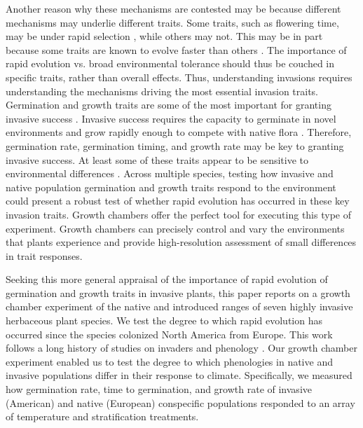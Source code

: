 \documentclass[12pt]{article}\usepackage[]{graphicx}\usepackage[]{color}
\begin{document}
	Another reason why these mechanisms are contested may be because different mechanisms may underlie different traits. Some traits, such as flowering time, may be under rapid selection \parencite{Weber1998}, while others may not. This may be in part because some traits are known to evolve faster than others \parencite{Weiss-Lehman2017}. The importance of rapid evolution vs. broad environmental tolerance should thus be couched in specific traits, rather than overall effects. Thus,  understanding invasions requires understanding the mechanisms driving the most essential invasion traits.  Germination and growth traits are some of the most important for granting invasive success \parencite{Sattin1997, Maillet2000}. Invasive success requires the capacity to germinate in novel environments and grow rapidly enough to compete with native flora \parencite{Grime1988}. Therefore, germination rate, germination timing, and growth rate may be key to granting invasive success. At least some of these traits appear to be sensitive to environmental differences \parencite{Leger2007}.  Across multiple species, testing how invasive and native population germination and growth traits respond to the environment could present a robust test of whether rapid evolution has occurred in these key invasion traits. Growth chambers offer the perfect tool for executing this type of experiment. Growth chambers can precisely control and vary the environments that plants experience and provide high-resolution assessment of small differences in trait responses.
	
	Seeking this more general appraisal of the importance of rapid evolution of germination and growth traits in invasive plants, this paper reports on a growth chamber experiment of the native and introduced ranges of seven highly invasive herbaceous plant species. We test the degree to which rapid evolution has occurred since the species colonized North America from Europe.  This work follows a long history of studies on invaders and phenology \parencite{Wolkovich2014}. Our growth chamber experiment enabled us to test the degree to which phenologies in native and invasive populations differ in their response to climate.   Specifically, we measured how germination rate, time to germination, and growth rate of invasive (American) and native (European) conspecific populations responded to an array of temperature and stratification treatments.
	
\end{document}
